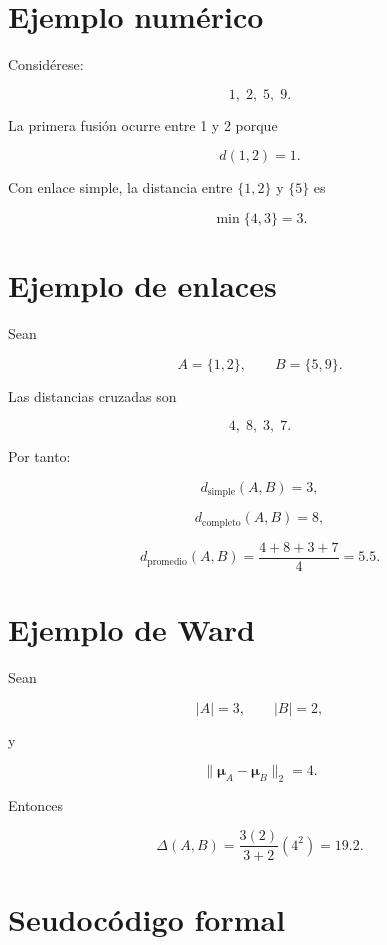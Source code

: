 \documentclass[
  spanish,
  10.5pt,
  letterpaper,
  DIV=11,
  numbers=noendperiod,
  oneside,
  open=any]{scrreprt}
\theoremstyle{definition}
\theoremstyle{definition}
\theoremstyle{plain}
\theoremstyle{remark}
\begin{document}
\section*{Ejemplo numérico}\label{ejemplo-numuxe9rico-2}


Considérese:

\[
1,\;2,\;5,\;9.
\]

La primera fusión ocurre entre 1 y 2 porque

\[
d(1,2)=1.
\]

Con enlace simple, la distancia entre \(\{1,2\}\) y \(\{5\}\) es

\[
\min\{4,3\}=3.
\]

\section*{Ejemplo de enlaces}\label{ejemplo-de-enlaces}


Sean

\[
A=\{1,2\},
\qquad
B=\{5,9\}.
\]

Las distancias cruzadas son

\[
4,\;8,\;3,\;7.
\]

Por tanto:

\[
d_{\text{simple}}(A,B)=3,
\]

\[
d_{\text{completo}}(A,B)=8,
\]

\[
d_{\text{promedio}}(A,B)
=
\frac{4+8+3+7}{4}
=
5.5.
\]

\section*{Ejemplo de Ward}\label{ejemplo-de-ward}


Sean

\[
|A|=3,
\qquad
|B|=2,
\]

y

\[
\|\boldsymbol{\mu}_A-\boldsymbol{\mu}_B\|_2=4.
\]

Entonces

\[
\Delta(A,B)
=
\frac{3(2)}{3+2}(4^2)
=
19.2.
\]

\section*{Seudocódigo formal}\label{seudocuxf3digo-formal-10}
\end{document}
